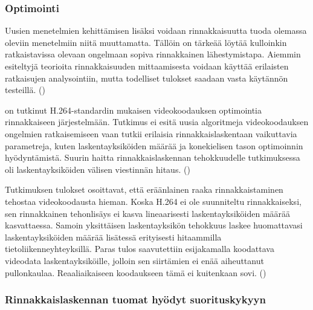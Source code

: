 \subsubsection{Optimointi}

Uusien menetelmien kehittämisen lisäksi voidaan rinnakkaisuutta tuoda
olemassa oleviin menetelmiin niitä muuttamatta. Tällöin on tärkeää löytää
kulloinkin ratkaistavissa olevaan ongelmaan sopiva rinnakkainen lähestymistapa.
Aiemmin esiteltyjä teorioita rinnakkaisuuden mittaamisesta voidaan käyttää
erilaisten ratkaisujen analysointiin, mutta todelliset tulokset saadaan
vasta käytännön testeillä. (\citealt{li})

\citealt{li} on tutkinut H.264-standardin mukaisen videokoodauksen optimointia
rinnakkaiseen järjestelmään. Tutkimus ei esitä uusia algoritmeja
videokoodauksen ongelmien ratkaisemiseen vaan tutkii erilaisia
rinnakkaislaskentaan vaikuttavia parametreja, kuten laskentayksiköiden määrää
ja konekielisen tason optimoinnin hyödyntämistä. Suurin haitta
rinnakkaislaskennan tehokkuudelle tutkimuksessa oli laskentayksiköiden välisen
viestinnän hitaus. (\citealt{li})

Tutkimuksen tulokset osoittavat, että eräänlainen raaka rinnakkaistaminen
tehostaa videokoodausta hieman. Koska H.264 ei ole suunniteltu rinnakkaiseksi,
sen rinnakkainen tehonlisäys ei kasva lineaarisesti laskentayksiköiden määrää
kasvattaessa. Samoin yksittäisen laskentayksikön tehokkuus laskee huomattavasi
laskentayksiköiden määrää lisätessä erityisesti hitaammilla
tietoliikenneyhteyksillä. Paras tulos saavutettiin esijakamalla koodattava
videodata laskentayksiköille, jolloin sen siirtämien ei enää aiheuttanut
pullonkaulaa. Reaaliaikaiseen koodaukseen tämä ei
kuitenkaan sovi. (\citealt{li})

\subsubsection{Rinnakkaislaskennan tuomat hyödyt suorituskykyyn}

